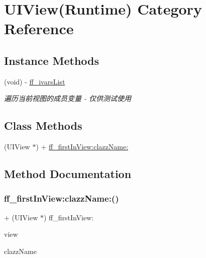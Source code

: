 \hypertarget{category_u_i_view_07_runtime_08}{}\section{U\+I\+View(Runtime) Category Reference}
\label{category_u_i_view_07_runtime_08}
\subsection*{Instance Methods}
\begin{DoxyCompactItemize}
\item 
(void) -\/ \mbox{\hyperlink{category_u_i_view_07_runtime_08_a942ed2555858e4e283c432579df0f815}{ff\+\_\+ivars\+List}}
\begin{DoxyCompactList}\small\item\em 遍历当前视图的成员变量 -\/ 仅供测试使用 \end{DoxyCompactList}\end{DoxyCompactItemize}
\subsection*{Class Methods}
\begin{DoxyCompactItemize}
\item 
(U\+I\+View $\ast$) + \mbox{\hyperlink{category_u_i_view_07_runtime_08_ae9c38ade680294a887ca673c75e43110}{ff\+\_\+first\+In\+View\+:clazz\+Name\+:}}
\end{DoxyCompactItemize}


\subsection{Method Documentation}
\mbox{\label{category_u_i_view_07_runtime_08_ae9c38ade680294a887ca673c75e43110}} 
\subsubsection{\texorpdfstring{ff\+\_\+first\+In\+View\+:clazz\+Name\+:()}{ff\_firstInView:clazzName:()}}
{\footnotesize\ttfamily + (U\+I\+View $\ast$) ff\+\_\+first\+In\+View\+: \begin{DoxyParamCaption}\item[{(U\+I\+View $\ast$)}]{view }\item[{clazzName:(N\+S\+String $\ast$)}]{clazz\+Name }\end{DoxyParamCaption}}

